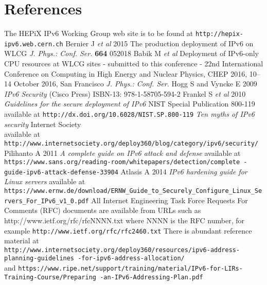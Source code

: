 \section*{References}

\begin{thebibliography}{1}
 The HEPiX IPv6 Working Group web site is to be found at {\tt http://hepix-ipv6.web.cern.ch}
 Bernier J {\it et al} 2015 The production deployment of IPv6 on WLCG  {\it J. Phys.: Conf. Ser.} {\bf664} 052018 
 Babik M {\it et al}  Deployment of IPv6-only CPU resources at WLCG sites - submitted to this conference - 22nd International Conference on Computing in High Energy and Nuclear Physics, CHEP 2016, 10–14 October 2016, San Francisco {\it J. Phys.: Conf. Ser.}
    Hogg S and Vyncke E 2009 {\it IPv6 Security} (Cisco Press) ISBN-13: 978-1-58705-594-2
 Frankel S {\it et al} 2010 {\it Guidelines for the secure deployment of IPv6} NIST Special Publication 800-119 available at {\tt  http://dx.doi.org/10.6028/NIST.SP.800-119}
 {\it Ten myths of IPv6 security} Internet Society \\ available at {\tt http://www.internetsociety.org/deploy360/blog/category/ipv6/security/}
 Pilihanto A 2011 {\it A complete guide on IPv6 attack and defense} available at \hfill \break 
  {\tt https://www.sans.org/reading-room/whitepapers/detection/complete \hfill \break -guide-ipv6-attack-defense-33904}
 Atlasis A 2014 {\it IPv6 hardening guide for Linux servers} available at \\
  {\tt https://www.ernw.de/download/ERNW\_Guide\_to\_Securely\_Configure\_Linux\_Servers\_For\_IPv6\_v1\_0.pdf}
 All Internet Engineering Task Force Requests For Comments (RFC) documents are available
from URLs such as http://www.ietf.org/rfc/rfcNNNN.txt where NNNN is the RFC number, for example {\tt http://www.ietf.org/rfc/rfc2460.txt}
 There is abundant reference material at \\
{\tt http://www.internetsociety.org/deploy360/resources/ipv6-address-planning-guidelines \hfill \break -for-ipv6-address-allocation/} \\
and {\tt https://www.ripe.net/support/training/material/IPv6-for-LIRs-Training-Course/Preparing \hfill \break -an-IPv6-Addressing-Plan.pdf}
\end{thebibliography}
